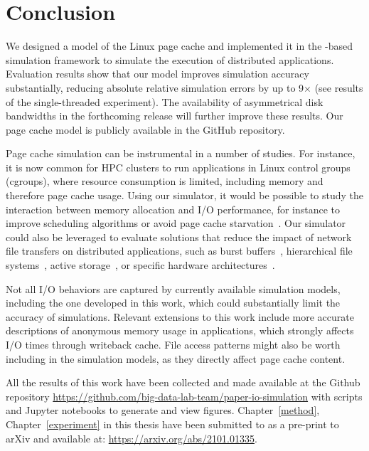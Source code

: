 \chapter{Conclusion}
\label{conclusion}

We designed a model of the Linux page cache and implemented it in the
\simgrid-based \wrench simulation framework to simulate the execution
of distributed applications.
Evaluation results show that our model improves simulation accuracy
substantially, reducing absolute relative simulation errors by up to
9$\times$ (see results of the single-threaded experiment). The
availability of asymmetrical disk bandwidths in the forthcoming
\simgrid release will further improve these results.
Our page cache model is publicly available in the \wrench GitHub
repository.

Page cache simulation can be instrumental in a number of studies. For
instance, it is now common for HPC clusters to run applications in
Linux control groups (cgroups), where resource consumption is limited,
including memory and therefore page cache usage. Using our simulator,
it would be possible to study the interaction between memory allocation
and I/O performance, for instance to improve scheduling algorithms or
avoid page cache starvation~\cite{zhuang2017}. Our simulator could also
be leveraged to evaluate solutions that reduce the impact of network
file transfers on distributed applications, such as burst
buffers~\cite{ferreiradasilva-fgcs-bb-2019}, hierarchical file
systems~\cite{islam2015triple}, active storage~\cite{5496981}, or
specific hardware architectures~\cite{hayot2020performance}. 

Not all I/O behaviors are captured by currently available simulation models,
including the one developed in this work, 
which could substantially limit the accuracy of simulations.
Relevant extensions to this work include more
accurate descriptions of anonymous memory usage in applications, 
which strongly affects I/O times through writeback cache. File access patterns
 might also be worth including in the simulation models,
as they directly affect page cache content.

All the results of this work have been collected and made available at the Github repository 
\url{https://github.com/big-data-lab-team/paper-io-simulation} 
with scripts and Jupyter notebooks to generate and view figures. 
Chapter~\ref{method}, Chapter~\ref{experiment} in this thesis have been 
submitted to as a pre-print to arXiv and available at: 
\url{https://arxiv.org/abs/2101.01335}. 

